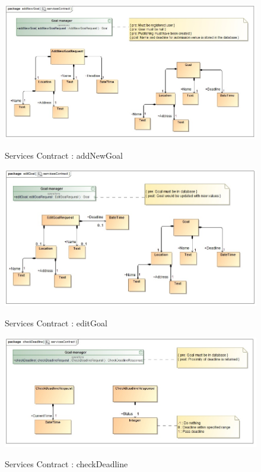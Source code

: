 \documentclass{article}
\begin{document}
		\begin{figure}[H]
			\includegraphics[width=\textwidth]{Ruan_Diagrams/addNewGoal_servicesContract.jpg}  \\
			\caption{Services Contract : addNewGoal}
		\end{figure}
		\begin{figure}[H]
			\includegraphics[width=\textwidth]{Ruan_Diagrams/editGoal_servicesContract.jpg}  \\
			\caption{Services Contract : editGoal}
		\end{figure}
		\begin{figure}[H]
			\includegraphics[width=\textwidth]{Ruan_Diagrams/checkDeadline_servicesContract.jpg}  \\
			\caption{Services Contract : checkDeadline}
		\end{figure}
\end{document}
